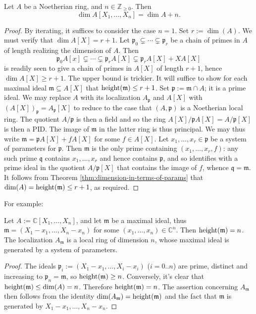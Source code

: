 \documentclass[reqno]{amsart}
\begin{document}
\begin{theorem}
Let $A$ be a Noetherian ring,
and $n \in \mathbb{Z}_{\geq 0}$.
Then \[\dim A[X_1,\dotsc,X_n] = \dim A + n.\]
\end{theorem}
\begin{proof}
  By iterating, it suffices to consider the case $n=1$.
  Set $r := \dim(A)$.
  We must verify that $\dim A[X] = r + 1$.
  Let $\mathfrak{p}_0 \subsetneq \dotsb \subsetneq
  \mathfrak{p}_r$ be a chain of primes in $A$ of length realizing the dimension of $A$.
  Then
  \[
    \mathfrak{p}_0 A[x] \subsetneq \dotsb \subsetneq
    \mathfrak{p}_r A[X]
    \subsetneq \mathfrak{p}_r A[X] + X A[X]
  \]
  is readily seen to give a chain of primes in $A[X]$ of length
  $r+1$,
  hence $\dim A[X] \geq r + 1$.
  The upper bound is trickier.
  It will suffice to show for each maximal ideal $\mathfrak{m}
  \subseteq A[X]$ 
  that $\operatorname{height}(\mathfrak{m}) \leq r + 1$.
  Set $\mathfrak{p} := \mathfrak{m} \cap A$;
  it is a prime ideal.
  We may replace $A$ with its localization $A_\mathfrak{p}$
  and $A[X]$ with 
  $(A[X])_\mathfrak{p} = A_\mathfrak{p}[X]$
  to reduce to the case that $(A,\mathfrak{p})$ is a Noetherian
  local ring.
  The quotient $A/\mathfrak{p}$ is then a field
  and so the ring $A[X]/\mathfrak{p} A[X] = A/\mathfrak{p}[X]$ is then
  a PID.
  The image of $\mathfrak{m}$ in the latter ring is thus
  principal.
  We may thus write $\mathfrak{m} = \mathfrak{p} A[X] + f A[X]$
  for some $f \in A[X]$.
  Let $x_1,\dotsc,x_r \in \mathfrak{p}$ be a system  of
  parameters for $\mathfrak{p}$.
  Then $\mathfrak{m}$ is the only prime containing
  $(x_1,\dotsc,x_r,f)$:
  any such prime $\mathfrak{q}$ contains $x_1,\dotsc,x_r$
  and hence contains $\mathfrak{p}$,
  and so identifies with a prime ideal in the quotient
  $A/\mathfrak{p}[X]$ that contains
  the image of $f$,
  whence $\mathfrak{q} = \mathfrak{m}$.
  It follows from Theorem
  \ref{thm:dimension-in-terms-of-params} that $\dim(A) = \operatorname{height}(\mathfrak{m}) \leq r + 1$, as required.
\end{proof}
For example:
\begin{proposition}
  Let $A := \mathbb{C}[X_1,\dotsc,X_n]$,
  and let $\mathfrak{m}$ be a maximal ideal,
  thus $\mathfrak{m} = (X_1-x_1,\dotsc,X_n-x_n)$
  for some $(x_1,\dotsc,x_n) \in \mathbb{C}^n$.
  Then
  $\operatorname{height}(\mathfrak{m}) = n$.
  The localization $A_\mathfrak{m}$ is a local ring of
  dimension $n$,
  whose maximal ideal is generated by a system of parameters.
\end{proposition}
\begin{proof}
  The  ideals $\mathfrak{p}_i := (X_1-x_1, \dotsc, X_i - x_i)$
  ($i=0..n$) are prime, distinct and increasing
  to $\mathfrak{p}_n = \mathfrak{m}$,
  so $\operatorname{height}(\mathfrak{m}) \geq n$.
  Conversely,
  it's clear that $\operatorname{height}(\mathfrak{m}) \leq \dim(A) = n$.
  Therefore $\operatorname{height}(\mathfrak{m}) = n$.
  The assertion concerning $A_\mathfrak{m}$
  then follows from the identity
  $\dim(A_\mathfrak{m}) = \operatorname{height}(\mathfrak{m})$
  and the fact that $\mathfrak{m}$
  is generated by $X_1-x_1,\dotsc,X_n-x_n$.
\end{proof}
\end{document}
